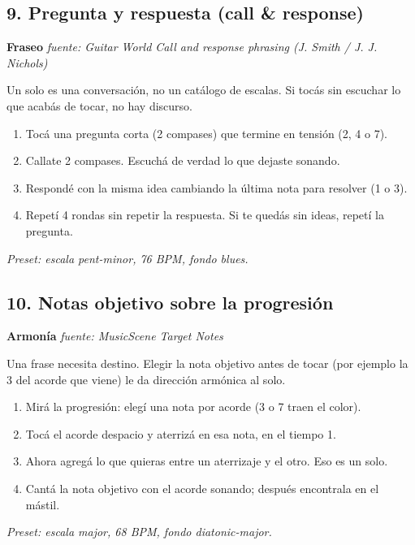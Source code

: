\documentclass[11pt,a4paper]{article}
\begin{document}
\subsection{9. Pregunta y respuesta (call \& response)}
\textbf{Fraseo} \hfill \emph{fuente: Guitar World \textemdash{} Call and response phrasing (J. Smith / J. J. Nichols)}
\par Un solo es una conversación, no un catálogo de escalas. Si tocás sin escuchar lo que acabás de tocar, no hay discurso.
\begin{enumerate}
\item Tocá una pregunta corta (2 compases) que termine en tensión (2, 4 o 7).
\item Callate 2 compases. Escuchá de verdad lo que dejaste sonando.
\item Respondé con la misma idea cambiando la última nota para resolver (1 o 3).
\item Repetí 4 rondas sin repetir la respuesta. Si te quedás sin ideas, repetí la pregunta.
\end{enumerate}
\emph{Preset: escala pent-minor, 76 BPM, fondo blues.}
\subsection{10. Notas objetivo sobre la progresión}
\textbf{Armonía} \hfill \emph{fuente: MusicScene \textemdash{} Target Notes}
\par Una frase necesita destino. Elegir la nota objetivo antes de tocar (por ejemplo la 3\textordfeminine{} del acorde que viene) le da dirección armónica al solo.
\begin{enumerate}
\item Mirá la progresión: elegí una nota por acorde (3\textordfeminine{} o 7\textordfeminine{} traen el color).
\item Tocá el acorde despacio y aterrizá en esa nota, en el tiempo 1.
\item Ahora agregá lo que quieras entre un aterrizaje y el otro. Eso es un solo.
\item Cantá la nota objetivo con el acorde sonando; después encontrala en el mástil.
\end{enumerate}
\emph{Preset: escala major, 68 BPM, fondo diatonic-major.}
\end{document}
